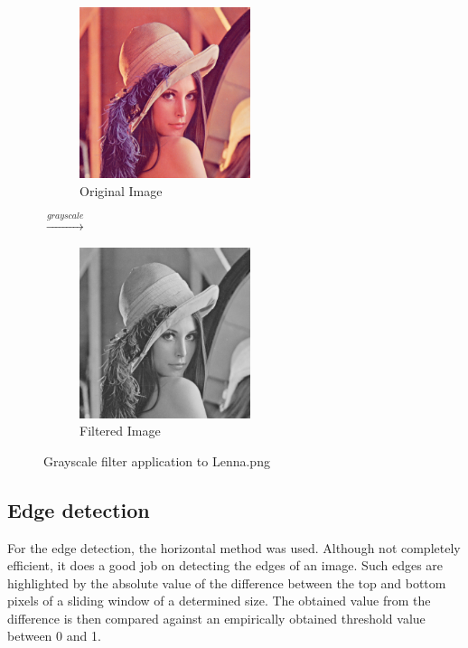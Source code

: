 \documentclass[a4paper,12pt]{article}
\begin{document}
	\begin{figure}[H]
		\centering
		\begin{subfigure}{.47\textwidth}
			\centering
			\includegraphics[width=5cm]{Lenna.png}
			\caption{Original Image}
		\end{subfigure}%
		{\LARGE$\xrightarrow{grayscale}$}%
		\begin{subfigure}{.47\textwidth}
			\centering
			\includegraphics[width=5cm]{jv_gray_Lenna.png}
			\caption{Filtered Image}
		\end{subfigure}

		\caption{Grayscale filter application to Lenna.png}
	\end{figure}		
		
	
	\subsection{Edge detection}
	
	For the edge detection, the horizontal method was used. Although not completely efficient, it does a good job on detecting the edges of an image. Such edges are highlighted by the absolute value of the difference between the top and bottom pixels of a sliding window of a determined size. The obtained value from the difference is then compared against an empirically obtained threshold value between 0 and 1.\\ 
\end{document}
